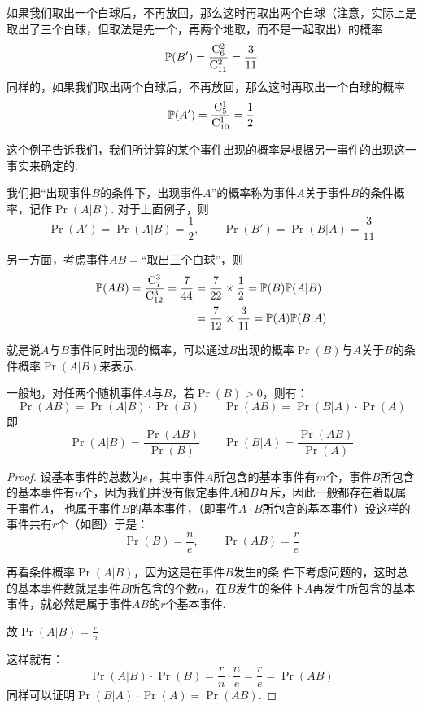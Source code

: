 如果我们取出一个白球后，不再放回，那么这时再取出两个白球（注意，实际上是取出了三个白球，但取法是先一个，再两个地取，而不是一起取出）的概率
\[\mathbb{P}(B')=\dfrac{{\rm C}^{2}_{6}}{{\rm C}^{2}_{11}}=\dfrac{3}{11}\]
同样的，如果我们取出两个白球后，不再放回，那么这时再取出一个白球的概率
\[\mathbb{P}(A')=\dfrac{{\rm C}^{1}_{5}}{{\rm C}^{1}_{10}}=\dfrac{1}{2}\]

这个例子告诉我们，我们所计算的某个事件出现的概率是根据另一事件的出现这一事实来确定的.

我们把“出现事件$B$的条件下，出现事件$A$”的概率称为事件$A$关于事件$B$的条件概率，记作$\Pr(A|B)$. 对于上面例子，则
\[\Pr(A')=\Pr(A|B)=\frac{1}{2},\qquad \Pr(B')=\Pr(B|A)=\frac{3}{11}\]

另一方面，考虑事件$AB=$“取出三个白球”，则
\[\begin{split}
    \mathbb{P}(AB)=\dfrac{{\rm C}^{3}_{7}}{{\rm C}^{3}_{12}}=\dfrac{7}{44}&=\dfrac{7}{22}\times\dfrac{1}{2}=\mathbb{P}(B)\mathbb{P}(A|B)\\
    &=\dfrac{7}{12}\times\dfrac{3}{11}=\mathbb{P}(A)\mathbb{P}(B|A)\\
\end{split} \]

就是说$A$与$B$事件同时出现的概率，可以通过$B$出现的概率$\Pr(B)$与$A$关于$B$的条件概率$\Pr(A|B)$来表示.

一般地，对任两个随机事件$A$与$B$，若$\Pr(B)>0$，则有：
\begin{equation}
  \Pr(AB)=\Pr(A|B)\cdot \Pr(B)  \qquad \Pr(AB)=\Pr(B|A)\cdot \Pr(A)\tag{1}
\end{equation}
即
\begin{equation}
    \Pr(A|B)=\frac{\Pr(AB)}{\Pr(B)}\qquad \Pr(B|A)=\frac{\Pr(AB)}{\Pr(A)}\tag{2}
\end{equation}

\begin{proof}
    设基本事件的总数为$e$，其中事件$A$所包含的基本事件有$m$个，事件$B$所包含的基本事件有$n$个，因为我们并没有假定事件$A$和$B$互斥，因此一般都存在着既属于事件$A$，
也属于事件$B$的基本事件，（即事件$A\cdot B$所包含的基本事件）设这样的事件共有$r$个（如图）于是：
\[\Pr(B)=\frac{n}{e},\qquad \Pr(AB)=\frac{r}{e}\]

\begin{center}
\end{center}

再看条件概率$\Pr(A|B)$，因为这是在事件$B$发生的条
件下考虑问题的，这时总的基本事件数就是事件$B$所包含的个数$n$，在$B$发生的条件下$A$再发生所包含的基本事件，就必然是属于事件$AB$的$r$个基本事件.

故$\Pr(A|B)=\frac{r}{n}$

这样就有：
\[\Pr(A|B)\cdot\Pr(B)=\frac{r}{n}\cdot \frac{n}{e}=\frac{r}{e}=\Pr(AB)\]
同样可以证明$\Pr(B|A)\cdot\Pr(A)=\Pr(AB)$.
\end{proof}


